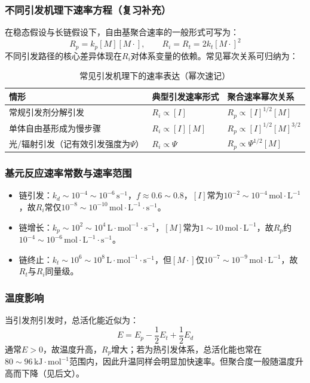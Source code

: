 ﻿\documentclass[12pt,a4paper]{article}
\renewcommand{\arraystretch}{1.18}
\begin{document}
\subsubsection{不同引发机理下速率方程（复习补充）}
在稳态假设与长链假设下，自由基聚合速率的一般形式可写为：
\[
R_p=k_p[M][M\cdot],\qquad R_i=R_t=2k_t[M\cdot]^2
\]
不同引发路径的核心差异体现在$R_i$对体系变量的依赖。常见幂次关系可归纳为：
\begin{table}[!htbp]
  \centering
  \caption{常见引发机理下的速率表达（幂次速记）}
  {\small
  \setlength{\tabcolsep}{6pt}
  \renewcommand{\arraystretch}{1.2}
  \begin{tabularx}{\textwidth}{C{3.3cm}Y Y}
    \toprule
    \textbf{情形} & \textbf{典型引发速率形式} & \textbf{聚合速率幂次关系} \\
    \midrule
    常规引发剂分解引发 & $R_i\propto [I]$ & $R_p\propto [I]^{1/2}[M]$ \\
    单体自由基形成为慢步骤 & $R_i\propto [I][M]$ & $R_p\propto [I]^{1/2}[M]^{3/2}$ \\
    光/辐射引发（记有效引发强度为$\Psi$） & $R_i\propto \Psi$ & $R_p\propto \Psi^{1/2}[M]$ \\
    \bottomrule
  \end{tabularx}
  }
\end{table}

\subsubsection{基元反应速率常数与速率范围}
\begin{itemize}
  \item 链引发：$k_d\sim10^{-4}\sim10^{-6}\,\mathrm{s^{-1}}$，$f\approx0.6\sim0.8$，$[I]$常为$10^{-2}\sim10^{-4}\,\mathrm{mol\cdot L^{-1}}$，故$R_i$常仅$10^{-8}\sim10^{-10}\,\mathrm{mol\cdot L^{-1}\cdot s^{-1}}$。
  \item 链增长：$k_p\sim10^2\sim10^4\,\mathrm{L\cdot mol^{-1}\cdot s^{-1}}$，$[M]$常为$1\sim10\,\mathrm{mol\cdot L^{-1}}$，故$R_p$约$10^{-4}\sim10^{-6}\,\mathrm{mol\cdot L^{-1}\cdot s^{-1}}$。
  \item 链终止：$k_t\sim10^6\sim10^8\,\mathrm{L\cdot mol^{-1}\cdot s^{-1}}$，但$[M\cdot]$仅$10^{-7}\sim10^{-9}\,\mathrm{mol\cdot L^{-1}}$，故$R_t$与$R_i$同量级。
\end{itemize}

\subsubsection{温度影响}
当引发剂引发时，总活化能近似为：
\[
E=E_p-\frac{1}{2}E_t+\frac{1}{2}E_d
\]
通常$E>0$，故温度升高，$R_p$增大；若为热引发体系，总活化能也常在$80\sim96\,\mathrm{kJ\cdot mol^{-1}}$范围内，因此升温同样会明显加快速率。但聚合度一般随温度升高而下降（见后文）。
\end{document}
